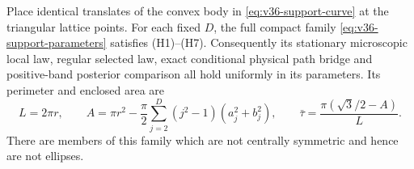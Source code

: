\begin{proposition}
\label{prop:v36-support-family}
Place identical translates of the convex body in
\eqref{eq:v36-support-curve} at the triangular lattice points.
For each fixed $D$, the full compact family
\eqref{eq:v36-support-parameters} satisfies \textup{(H1)--(H7)}.
Consequently its stationary microscopic local law, regular selected
law, exact conditional physical path bridge and positive-band
posterior comparison all hold uniformly in its parameters.
Its perimeter and enclosed area are
\begin{equation}\label{eq:v36-support-area}
 L=2\pi r,\qquad
 A=\pi r^2-\frac\pi2\sum_{j=2}^D(j^2-1)(a_j^2+b_j^2),
 \qquad \bar\tau=\frac{\pi(\sqrt3/2-A)}{L}.
\end{equation}
There are members of this family which are not centrally symmetric
and hence are not ellipses.
\end{proposition}
